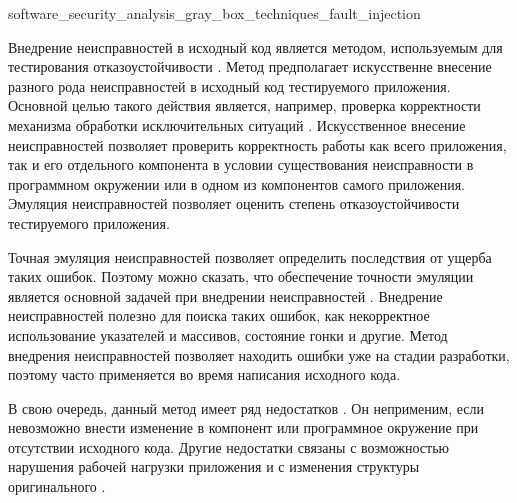 
	{software_security_analysis_gray_box_techniques_fault_injection}

%
Внедрение неисправностей в исходный код является методом, используемым для тестирования отказоустойчивости  . 
%
Метод предполагает искусственне внесение разного рода неисправностей в исходный код тестируемого приложения. 
%
Основной целью такого действия является, например, проверка корректности механизма обработки исключительных ситуаций . 
%
Искусственное внесение неисправностей позволяет проверить корректность работы как всего приложения, так и его отдельного компонента в условии существования неисправности в программном окружении или в одном из компонентов самого приложения. 
%
Эмуляция неисправностей  позволяет оценить степень отказоустойчивости тестируемого приложения.

%
Точная  эмуляция неисправностей позволяет определить последствия от ущерба таких ошибок. 
%
Поэтому можно сказать, что обеспечение точности эмуляции является основной задачей при внедрении неисправностей . 
%
Внедрение неисправностей полезно для поиска таких ошибок, как некорректное использование указателей и массивов, состояние гонки и другие. 
%
Метод внедрения неисправностей позволяет находить ошибки уже на стадии разработки, поэтому часто применяется  во время написания исходного кода.

%
В свою очередь, данный метод имеет ряд недостатков . 
%
Он неприменим, если невозможно внести изменение в компонент или программное окружение при отсутствии исходного кода. 
%
Другие недостатки связаны с возможностью нарушения рабочей нагрузки приложения и с изменения структуры оригинального .